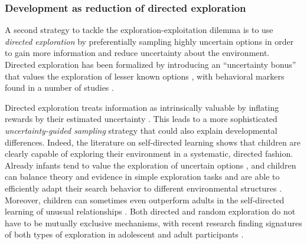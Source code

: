 \documentclass[a4paper,man, floatsintext, natbib]{apa6}
\begin{document}
\subsubsection{Development as reduction of directed exploration} 

A second strategy to tackle the exploration-exploitation dilemma is to use \emph{directed exploration} by preferentially sampling highly uncertain options in order to gain more information and reduce uncertainty about the environment. Directed exploration has been formalized by introducing an ``uncertainty bonus'' that values the exploration of lesser known options \citep{auer2002using}, with behavioral markers found in a number of studies \citep{frank2009prefrontal,wu2018exploration}.

Directed exploration treats information as intrinsically valuable by inflating rewards by their estimated uncertainty \citep{auer2002using}. This leads to a more sophisticated \emph{uncertainty-guided sampling} strategy that could also explain developmental differences. Indeed, the literature on self-directed learning shows that children are clearly capable of exploring their environment in a systematic, directed fashion. Already infants tend to value the exploration of uncertain options \citep{schulz2015infants}, and children can balance theory and evidence in simple exploration tasks \citep{bonawitz2012children} and are able to efficiently adapt their search behavior to different environmental structures \citep{Ruggeri2015}. Moreover, children can sometimes even outperform adults in the self-directed learning of unusual relationships \citep{Lucas2014}. Both directed and random exploration do not have to be mutually exclusive mechanisms, with recent research finding signatures of both types of exploration in adolescent and adult participants \citep{somerville2017charting,gershman2018deconstructing,wilson2014humans}.
\end{document}
